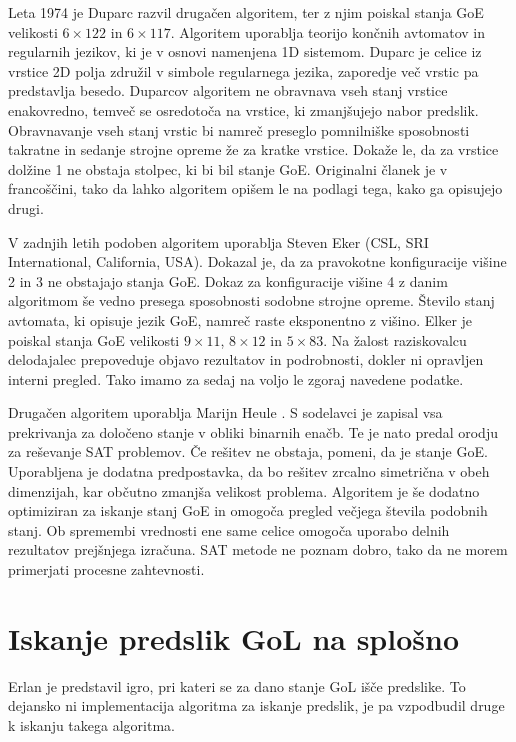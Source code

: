 \documentclass[12pt,a4paper,openany,twoside]{book}
\begin{document}
Leta 1974 je Duparc \cite{Duparc1972, Duparc1974} razvil drugačen algoritem,
ter z njim poiskal stanja GoE velikosti \(6 \times 122\) in \(6 \times 117\).
Algoritem uporablja teorijo končnih avtomatov in regularnih jezikov, ki je v
osnovi namenjena 1D sistemom.
Duparc je celice iz vrstice 2D polja združil v simbole regularnega jezika,
zaporedje več vrstic pa predstavlja besedo.
Duparcov algoritem ne obravnava vseh stanj vrstice enakovredno,
temveč se osredotoča na vrstice, ki zmanjšujejo nabor predslik.
Obravnavanje vseh stanj vrstic bi namreč preseglo pomnilniške sposobnosti
takratne in sedanje strojne opreme že za kratke vrstice.
Dokaže le, da za vrstice dolžine 1 ne obstaja stolpec, ki bi bil stanje GoE.
Originalni članek je v francoščini, tako da lahko algoritem opišem le na podlagi tega, kako ga opisujejo drugi.

V zadnjih letih podoben algoritem uporablja Steven Eker (CSL, SRI International, California, USA).
Dokazal je, da za pravokotne konfiguracije višine 2 in 3 ne obstajajo stanja GoE.
Dokaz za konfiguracije višine 4 z danim algoritmom še vedno presega sposobnosti sodobne strojne opreme.
Število stanj avtomata, ki opisuje jezik GoE, namreč raste eksponentno z višino.
Elker je poiskal stanja GoE velikosti \(9 \times 11\), \(8 \times 12\) in \(5 \times 83\).
Na žalost raziskovalcu delodajalec prepoveduje objavo rezultatov in podrobnosti, dokler ni opravljen interni pregled.
Tako imamo za sedaj na voljo le zgoraj navedene podatke.

Drugačen algoritem uporablja Marijn Heule \cite{Hartman2013}.
S sodelavci je zapisal vsa prekrivanja za določeno stanje v obliki binarnih enačb.
Te je nato predal orodju za reševanje SAT problemov.
Če rešitev ne obstaja, pomeni, da je stanje GoE.
Uporabljena je dodatna predpostavka, da bo rešitev zrcalno simetrična v obeh dimenzijah,
kar občutno zmanjša velikost problema.
Algoritem je še dodatno optimiziran za iskanje stanj GoE in
omogoča pregled večjega števila podobnih stanj.
Ob spremembi vrednosti ene same celice omogoča uporabo delnih rezultatov prejšnjega izračuna.
SAT metode ne poznam dobro, tako da ne morem primerjati procesne zahtevnosti.

\section{Iskanje predslik GoL na splošno}

Erlan \cite{Erlan2012} je predstavil igro, pri kateri se za dano stanje
GoL išče predslike. To dejansko ni implementacija algoritma za iskanje predslik,
je pa vzpodbudil druge k iskanju takega algoritma.
\end{document}
